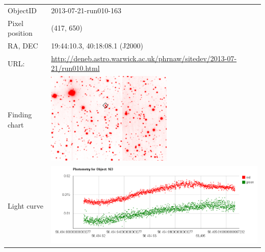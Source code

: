   \begin{tabular}{l l}
  \hline
  ObjectID & 2013-07-21-run010-163 \\
  Pixel position & (417, 650) \\
  RA, DEC & 19:44:10.3, 40:18:08.1 (J2000) \\
  URL: & \small \url{http://deneb.astro.warwick.ac.uk/phrnaw/sitedev/2013-07-21/run010.html} \\
  Finding chart & \includegraphics[width=60mm]{images/2013-07-21-run010-163.png} \\
  Light curve & \includegraphics[width=120mm]{images/2013-07-21-run010-163_lightcurve.png} \\
  \hline
  \end{tabular}



